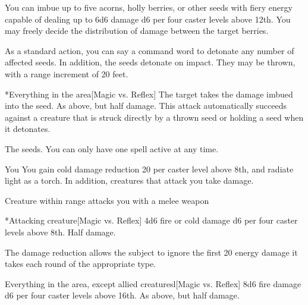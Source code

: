 \spellline
\spelleffect You can imbue up to five acorns, holly berries, or other seeds with fiery energy capable of dealing up to 6d6 damage \add d6 per four caster levels above 12th. You may freely decide the distribution of damage between the target berries.

As a standard action, you can say a command word to detonate any number of affected seeds. In addition, the seeds detonate on impact. They may be thrown, with a range increment of 20 feet.
\begin{spelltarget}*{Everything in the area}[Magic vs. Reflex]
    \spellsuccess The target takes the damage imbued into the seed.
    \spellfailure As above, but half damage.
    \spellspecial This attack automatically succeeds against a creature that is struck directly by a thrown seed or holding a seed when it detonates.
\end{spelltarget}
 The seeds.
\spellnotes You can only have one  spell active at any time.

\spelldur{\durshort \dismissable}
\begin{spelltarget}{You}
    \spelleffect You gain cold damage reduction 20  per caster level above 8th, and radiate light as a torch. In addition, creatures that attack you take damage.
\end{spelltarget}
\begin{spelltrigger}{Creature within \rngclose range attacks you with a melee weapon}
    \begin{spelltarget}*{Attacking creature}[Magic vs. Reflex]
        \spellsuccess 4d6 fire or cold damage \add d6 per four caster levels above 8th.
        \spellfailure Half damage.
    \end{spelltarget}
\end{spelltrigger}

\spellnotes The damage reduction allows the subject to ignore the first 20 energy damage it takes each round of the appropriate type.

\begin{spelltargets}{Everything in the area, except allied creatures}l[Magic vs. Reflex]
    \spellsuccess 8d6 fire damage \add d6 per four caster levels above 16th.
    \spellfailure As above, but half damage.
\end{spelltargets}

